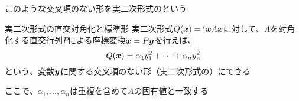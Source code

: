 \documentclass[../../../topic_linear-algebra]{subfiles}
\begin{document}
\br

このような交叉項のない形を実二次形式のという

\begin{theorem}{実二次形式の直交対角化と標準形}
  実二次形式$Q(\vb*{x}) = {}^t \vb*{x} A \vb*{x}$に対して、$A$を対角化する直交行列$P$による座標変換$\vb*{x} = P\vb*{y}$を行えば、
  \begin{equation*}
    Q(\vb*{x}) = \alpha_1 y_1^2 + \cdots + \alpha_n y_n^2
  \end{equation*}
  という、変数$\vb*{y}$に関する交叉項のない形（実二次形式の）にできる

  ここで、$\alpha_1, \ldots, \alpha_n$は重複を含めて$A$の固有値と一致する
\end{theorem}
\end{document}
